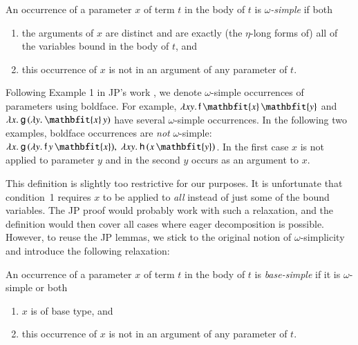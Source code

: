   \begin{defi}
  [$\jp D2$]\label{unif:def:omega-simple}An occurrence of a parameter $x$ of term $t$
  in the body of $t$ is $\omega$\emph{-simple }if both
  \begin{enumerate}
  \item the arguments of $x$ are distinct and are exactly (the $\eta$-long
  forms of) all of the variables bound in the body of $t$, and
  \item this occurrence of $x$ is not in an argument of any parameter
  of $t$.
  \end{enumerate}
  \end{defi}
  
  \begin{exa}
    Following Example 1 in JP's work \cite{jp-76-unif}, we denote
    $\omega$-simple occurrences of parameters using boldface. For example,
    $\lambda xy. \, \cst{f} \, \mathbfit{x} \, \mathbfit{y}$ and $\lamx{\cst{g}
    \, (\lam{y}{\mathbfit{x}\, y})}$ have several $\omega$-simple occurrences.
    In the following two examples, boldface occurrences are \emph{not}
    $\omega$-simple: $\lamx{\cst{g} \, (\lam{y}{\cst{f} \, y \, \mathbfit{x}})},\;
    \lam{xy}{\cst{h} \, (x \, \mathbfit{y})}$. In the first case $x$ is not applied to parameter $y$ and in the second $y$
    occurs as an argument to $x$.
  \end{exa}
  This definition is slightly too restrictive for our purposes.
  It is unfortunate that condition~1 requires $x$ to be applied to
  \emph{all} instead of just some of the bound variables. The JP
  proof would probably work with such a relaxation, and the definition
  would then cover all cases where eager decomposition is possible. 
  However, to reuse the JP lemmas, we stick to the original
  notion of $\omega$-simplicity and introduce the following relaxation:
  \begin{defi}
  An occurrence of a parameter $x$ of term $t$ in the body of $t$
  is \emph{base-simple} if it is $\omega$-simple or both
  \begin{enumerate}
  \item $x$ is of base type, and
  \item this occurrence of $x$ is not in an argument of any parameter
  of $t$.
  \end{enumerate}
  \end{defi}

